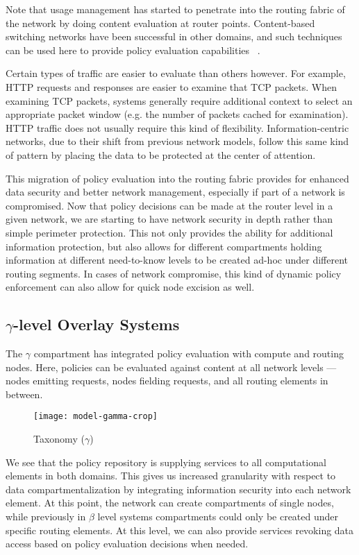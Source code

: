 Note that usage management has started to penetrate into the routing fabric of the network by doing content evaluation at router points.  Content-based switching networks have been successful in other domains, and such techniques can be used here to provide policy evaluation capabilities ~\cite{proposal:jboss-esb}.  

Certain types of traffic are easier to evaluate than others however.  For example, HTTP requests and responses are easier to examine that TCP packets.  When examining TCP packets, systems generally require additional context to select an appropriate packet window (e.g. the number of packets cached for examination).  HTTP traffic does not usually require this kind of flexibility.  Information-centric networks, due to their shift from previous network models, follow this same kind of pattern by placing the data to be protected at the center of attention.

This migration of policy evaluation into the routing fabric provides for enhanced data security and better network management, especially if part of a network is compromised.  Now that policy decisions can be made at the router level in a given network, we are starting to have network security in depth rather than simple perimeter protection.  This not only provides the ability for additional information protection, but also allows for different compartments holding information at different need-to-know levels to be created ad-hoc under different routing segments.  In cases of network compromise, this kind of dynamic policy enforcement can also allow for quick node excision as well.

\subsection{$\gamma$-level Overlay Systems}
The $\gamma$ compartment has integrated policy evaluation with compute and routing nodes.  Here, policies can be evaluated against content at all network levels --- nodes emitting requests, nodes fielding requests, and all routing elements in between.

\begin{figure}[!t]
\centering
\texttt{[image: model-gamma-crop]}
\caption{Taxonomy ($\gamma$)}
\label{fig:model:taxonomy-gamma}
\end{figure}

We see that the policy repository is supplying services to all computational elements in both domains.  This gives us increased granularity with respect to data compartmentalization by integrating information security into each network element.  At this point, the network can create compartments of single nodes, while previously in $\beta$ level systems compartments could only be created under specific routing elements.  At this level, we can also provide services revoking data access based on policy evaluation decisions when needed.

